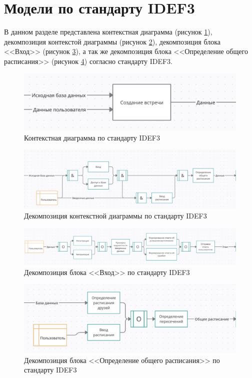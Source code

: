 \documentclass[14pt]{extreport}
\begin{document}
\section{Модели по стандарту IDEF3}
В данном разделе представлена контекстная диаграмма (рисунок \ref{fig:idef31}), декомпозиция контекстой диаграммы (рисунок \ref{fig:idef32}), декомпозиция блока <<Вход>> (рисунок \ref{fig:idef33}), а так же декомпозиция блока <<Определение общего расписания>> (рисунок \ref{fig:idef34}) согласно стандарту IDEF3. 
\begin{landscape}
    \begin{figure}[h]   
        \centering
        \includegraphics[width=0.7\linewidth]{img/IDEF3-0.png}
        \caption{ Контекстная диаграмма по стандарту IDEF3}
        \label{fig:idef31}
    \end{figure}

    \begin{figure}[h]   
        \centering
        \includegraphics[width=0.7\linewidth]{img/IDEF3-1-0.png}
        \caption{ Декомпозиция контекстной диаграммы по стандарту IDEF3}
        \label{fig:idef32}
    \end{figure}

    \begin{figure}[h]   
        \centering
        \includegraphics[width=0.9\linewidth]{img/IDEF3-2-0.png}
        \caption{ Декомпозиция блока <<Вход>> по стандарту IDEF3}
        \label{fig:idef33}
    \end{figure}

    \begin{figure}[h]   
        \centering
        \includegraphics[width=0.9\linewidth]{img/IDEF3-2-1.png}
        \caption{ Декомпозиция блока <<Определение общего расписания>> по стандарту IDEF3}
        \label{fig:idef34}
    \end{figure}
\end{landscape}
\end{document}
